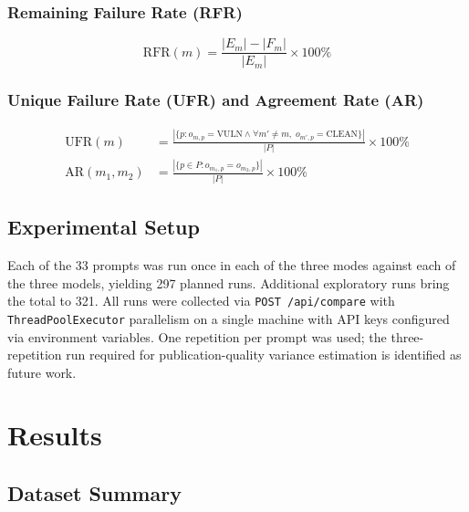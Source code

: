 \documentclass[12pt,a4paper]{report}
\begin{document}
\subsection{Remaining Failure Rate (RFR)}
\begin{equation}
\mathrm{RFR}(m) = \frac{|E_m| - |F_m|}{|E_m|} \times 100\%
\label{eq:rfr}
\end{equation}

\subsection{Unique Failure Rate (UFR) and Agreement Rate (AR)}
\begin{align}
\mathrm{UFR}(m) &=
  \frac{|\{p : o_{m,p}=\text{VULN} \wedge \forall m'\neq m,\;
           o_{m',p}=\text{CLEAN}\}|}{|P|} \times 100\% \label{eq:ufr}\\
\mathrm{AR}(m_1,m_2) &=
  \frac{|\{p \in P : o_{m_1,p} = o_{m_2,p}\}|}{|P|} \times 100\%
\label{eq:ar}
\end{align}

\section{Experimental Setup}
\label{sec:setup}

Each of the 33 prompts was run once in each of the three modes against each of
the three models, yielding 297 planned runs. Additional exploratory runs bring the
total to 321. All runs were collected via \texttt{POST /api/compare} with
\texttt{ThreadPoolExecutor} parallelism on a single machine with API keys
configured via environment variables. One repetition per prompt was used; the
three-repetition run required for publication-quality variance estimation is
identified as future work.

\chapter{Results}
\label{ch:results}

\section{Dataset Summary}
\label{sec:datasummary}
\end{document}

